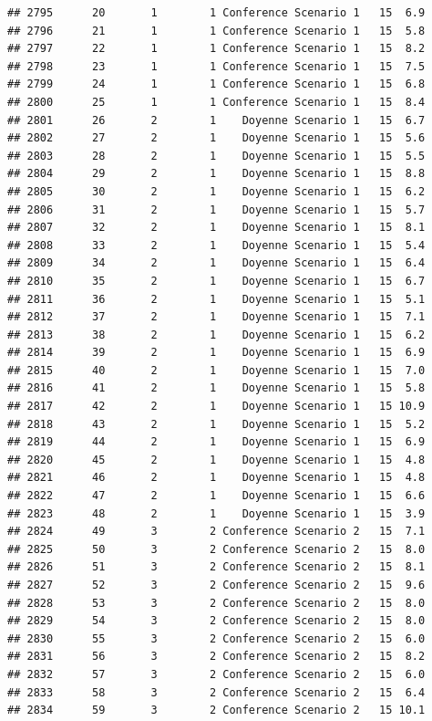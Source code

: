 \documentclass[
]{article}
\begin{document}
\begin{verbatim}
## 2795      20       1        1 Conference Scenario 1   15  6.9
## 2796      21       1        1 Conference Scenario 1   15  5.8
## 2797      22       1        1 Conference Scenario 1   15  8.2
## 2798      23       1        1 Conference Scenario 1   15  7.5
## 2799      24       1        1 Conference Scenario 1   15  6.8
## 2800      25       1        1 Conference Scenario 1   15  8.4
## 2801      26       2        1    Doyenne Scenario 1   15  6.7
## 2802      27       2        1    Doyenne Scenario 1   15  5.6
## 2803      28       2        1    Doyenne Scenario 1   15  5.5
## 2804      29       2        1    Doyenne Scenario 1   15  8.8
## 2805      30       2        1    Doyenne Scenario 1   15  6.2
## 2806      31       2        1    Doyenne Scenario 1   15  5.7
## 2807      32       2        1    Doyenne Scenario 1   15  8.1
## 2808      33       2        1    Doyenne Scenario 1   15  5.4
## 2809      34       2        1    Doyenne Scenario 1   15  6.4
## 2810      35       2        1    Doyenne Scenario 1   15  6.7
## 2811      36       2        1    Doyenne Scenario 1   15  5.1
## 2812      37       2        1    Doyenne Scenario 1   15  7.1
## 2813      38       2        1    Doyenne Scenario 1   15  6.2
## 2814      39       2        1    Doyenne Scenario 1   15  6.9
## 2815      40       2        1    Doyenne Scenario 1   15  7.0
## 2816      41       2        1    Doyenne Scenario 1   15  5.8
## 2817      42       2        1    Doyenne Scenario 1   15 10.9
## 2818      43       2        1    Doyenne Scenario 1   15  5.2
## 2819      44       2        1    Doyenne Scenario 1   15  6.9
## 2820      45       2        1    Doyenne Scenario 1   15  4.8
## 2821      46       2        1    Doyenne Scenario 1   15  4.8
## 2822      47       2        1    Doyenne Scenario 1   15  6.6
## 2823      48       2        1    Doyenne Scenario 1   15  3.9
## 2824      49       3        2 Conference Scenario 2   15  7.1
## 2825      50       3        2 Conference Scenario 2   15  8.0
## 2826      51       3        2 Conference Scenario 2   15  8.1
## 2827      52       3        2 Conference Scenario 2   15  9.6
## 2828      53       3        2 Conference Scenario 2   15  8.0
## 2829      54       3        2 Conference Scenario 2   15  8.0
## 2830      55       3        2 Conference Scenario 2   15  6.0
## 2831      56       3        2 Conference Scenario 2   15  8.2
## 2832      57       3        2 Conference Scenario 2   15  6.0
## 2833      58       3        2 Conference Scenario 2   15  6.4
## 2834      59       3        2 Conference Scenario 2   15 10.1

\end{verbatim}
\end{document}
